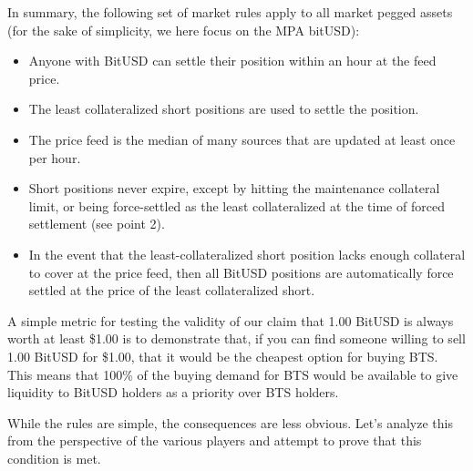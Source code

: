 In summary, the following set of market rules apply to all market pegged assets
(for the sake of simplicity, we here focus on the MPA bitUSD):
\begin{itemize}
 \item Anyone with BitUSD can settle their position within an hour at the feed
       price.
 \item The least collateralized short positions are used to settle the
       position.
 \item The price feed is the median of many sources that are updated at least
       once per hour.
 \item Short positions never expire, except by hitting the maintenance
       collateral limit, or being force-settled as the least collateralized at the
       time of forced settlement (see point 2).
 \item In the event that the least-collateralized short position lacks enough
       collateral to cover at the price feed, then all BitUSD positions are
       automatically force settled at the price of the least collateralized short.
\end{itemize}

A simple metric for testing the validity of our claim that 1.00 BitUSD is
always worth at least \$1.00 is to demonstrate that, if you can find someone
willing to sell 1.00 BitUSD for \$1.00, that it would be the cheapest option for
buying BTS. This means that 100\% of the buying demand for BTS would be
available to give liquidity to BitUSD holders as a priority over BTS holders.

While the rules are simple, the consequences are less obvious. Let's analyze
this from the perspective of the various players and attempt to prove that this
condition is met.
